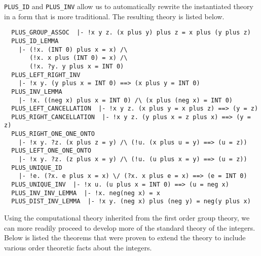 {\tt PLUS\_ID} and {\tt PLUS\_INV} allow us to automatically rewrite the
instantiated theory in a form that is more traditional.  The resulting theory
is listed below.
\begin{verbatim}
  PLUS_GROUP_ASSOC  |- !x y z. (x plus y) plus z = x plus (y plus z)
  PLUS_ID_LEMMA
    |- (!x. (INT 0) plus x = x) /\
       (!x. x plus (INT 0) = x) /\
       (!x. ?y. y plus x = INT 0)
  PLUS_LEFT_RIGHT_INV
    |- !x y. (y plus x = INT 0) ==> (x plus y = INT 0)
  PLUS_INV_LEMMA
    |- !x. ((neg x) plus x = INT 0) /\ (x plus (neg x) = INT 0)
  PLUS_LEFT_CANCELLATION  |- !x y z. (x plus y = x plus z) ==> (y = z)
  PLUS_RIGHT_CANCELLATION  |- !x y z. (y plus x = z plus x) ==> (y = z)
  PLUS_RIGHT_ONE_ONE_ONTO
    |- !x y. ?z. (x plus z = y) /\ (!u. (x plus u = y) ==> (u = z))
  PLUS_LEFT_ONE_ONE_ONTO
    |- !x y. ?z. (z plus x = y) /\ (!u. (u plus x = y) ==> (u = z))
  PLUS_UNIQUE_ID
    |- !e. (?x. e plus x = x) \/ (?x. x plus e = x) ==> (e = INT 0)
  PLUS_UNIQUE_INV  |- !x u. (u plus x = INT 0) ==> (u = neg x)
  PLUS_INV_INV_LEMMA  |- !x. neg(neg x) = x
  PLUS_DIST_INV_LEMMA  |- !x y. (neg x) plus (neg y) = neg(y plus x)
\end{verbatim}  
Using the computational theory inherited from the first order group
theory, we can more readily proceed to develop more of the standard theory
of the integers.  Below is listed the theorems that were proven to extend
the theory to include various order theoretic facts about the integers.
